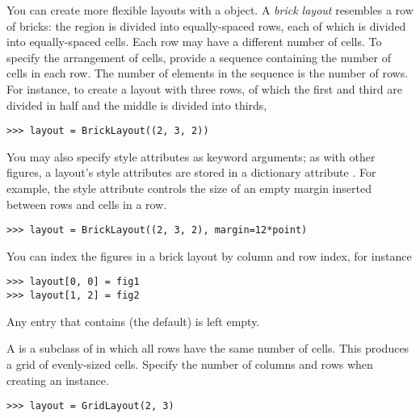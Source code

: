 You can create more flexible layouts with a  object.
A \textit{brick layout} resembles a row of bricks: the region is divided
into equally-spaced rows, each of which is divided into equally-spaced
cells.  Each row may have a different number of cells.  To specify the
arrangement of cells, provide a sequence containing the number of cells
in each row.  The number of elements in the sequence is the number of
rows.  For instance, to create a layout with three rows, of which the
first and third are divided in half and the middle is divided into
thirds,
\begin{verbatim}
>>> layout = BrickLayout((2, 3, 2))
\end{verbatim}
You may also specify style attributes as keyword arguments; as with
other figures, a layout's style attributes are stored in a dictionary
attribute .  For example, the  style
attribute controls the size of an empty margin inserted between rows and
cells in a row.
\begin{verbatim}
>>> layout = BrickLayout((2, 3, 2), margin=12*point)
\end{verbatim}

You can index the figures in a brick layout by column and row index, for
instance 
\begin{verbatim}
>>> layout[0, 0] = fig1
>>> layout[1, 2] = fig2
\end{verbatim}
Any entry that contains  (the default) is left empty.

A  is a subclass of  in which all
rows have the same number of cells.  This produces a grid of
evenly-sized cells.  Specify the number of columns and rows when
creating an instance.
\begin{verbatim}
>>> layout = GridLayout(2, 3)
\end{verbatim}


